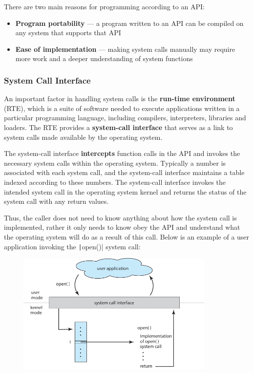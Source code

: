 \documentclass{article}
\begin{document}
There are two main reasons for programming according to an API:\@
\begin{itemize}
    \item \textbf{Program portability} --- a program written to an API
          can be compiled on any system that supports that API
    \item \textbf{Ease of implementation} --- making system
          calls manually may require more work and a deeper
          understanding of system functions
\end{itemize}
\subsubsection{System Call Interface}
An important factor in handling system calls is the \textbf{run-time
environment} (RTE), which is a suite of software needed to execute
applications written in a particular programming language, including
compilers, interpreters, libraries and loaders. The RTE provides a
\textbf{system-call interface} that serves as a link to system calls
made available by the operating system.

The system-call interface \textbf{intercepts} function calls in the API
and invokes the necessary system calls within the operating system.
Typically a number is associated with each system call, and the
system-call interface maintains a table indexed according to these
numbers. The system-call interface invokes the intended system call in
the operating system kernel and returns the status of the system call
with any return values.

Thus, the caller does not need to know anything about how the system
call is implemented, rather it only needs to know obey the API and
understand what the operating system will do as a result of this call.
Below is an example of a user application invoking the
\texttt|open()| system call:
\begin{figure}[H] \centering
    \includegraphics[height = 6cm]{figures/system_call_open.pdf}
\end{figure}
\end{document}
